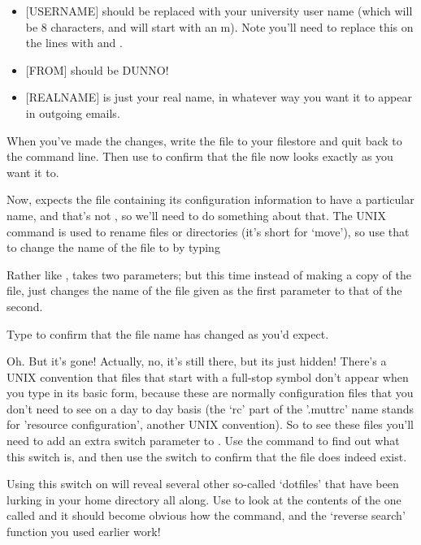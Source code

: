 \begin{itemize}
\item $[$USERNAME$]$ should be replaced with your university user name (which will be 8 characters, and will start with an m). Note you'll need to replace this on the lines with  and .
\item $[$FROM$]$ should be DUNNO!
\item $[$REALNAME$]$ is just your real name, in whatever way you want it to appear in outgoing emails.
\end{itemize}

When you've made the changes, write the file to your filestore and quit back to the command line. Then use  to confirm that the file now looks exactly as you want it to. 

Now,  expects the file containing its configuration information to have a particular name, and that's not , so we'll need to do something about that. The UNIX  command is used to rename files or directories (it's short for `move'), so use that to change the name of the file to  by typing


Rather like ,  takes two parameters; but this time instead of making a copy of the file,  just changes the name of the file given as the first parameter to that of the second. 

Type  to confirm that the file name has changed as you'd expect. 

Oh. But it's gone! Actually, no, it's still there, but its just hidden! There's a UNIX convention that files that start with a full-stop symbol don't appear when you type  in its basic form, because these are normally configuration files that you don't need to see on a day to day basis (the `rc' part of the '.muttrc' name stands for 'resource configuration', another UNIX convention). So to see these files you'll need to add an extra switch parameter to . Use the  command to find out what this switch is, and then use the switch to confirm that the  file does indeed exist. 

Using this switch on  will reveal several other so-called `dotfiles' that have been lurking in your home directory all along. Use  to look at the contents of the one called  and it should become obvious how the  command, and the `reverse search' function you used earlier work!


